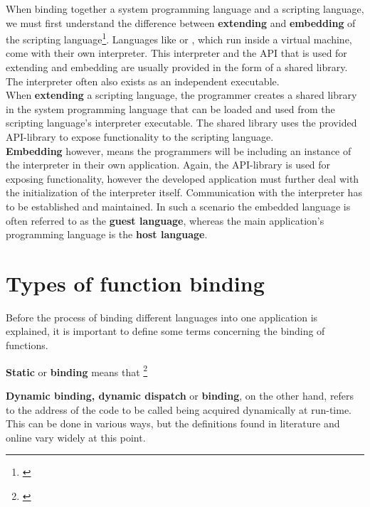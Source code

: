 When binding together a system programming language and a scripting language, we must first understand the difference between \textbf{extending} and \textbf{embedding} of the scripting language\footnote{\citep{PythonHP}}. Languages like  or , which run inside a virtual machine, come with their own interpreter. This interpreter and the API that is used for extending and embedding are usually provided in the form of a shared library. The interpreter often also exists as an independent executable. \\
When \textbf{extending} a scripting language, the programmer creates a shared library in the system programming language that can be loaded and used from the scripting language's interpreter executable. The shared library uses the provided API-library to expose functionality to the scripting language.\\
\textbf{Embedding} however, means the programmers will be including an instance of the interpreter in their own application. Again, the API-library is used for exposing functionality, however the developed application must further deal with the initialization of the interpreter itself. Communication with the interpreter has to be established and maintained. In such a scenario the embedded language is often referred to as the \textbf{guest language}, whereas the main application's programming language is the \textbf{host language}.

\section{Types of function binding}
\label{sec:TypesOfFunctionBinding}

Before the process of binding different languages into one application is explained, it is important to define some terms concerning the binding of functions.

\textbf{Static} or \textbf{ binding} means that \footnote{\citep[41]{ThinkingInCPP}}

\textbf{Dynamic binding, dynamic dispatch} or \textbf{ binding}, on the other hand, refers to the address of the code to be called being acquired dynamically at run-time. This can be done in various ways, but the definitions found in literature and online vary widely at this point.


